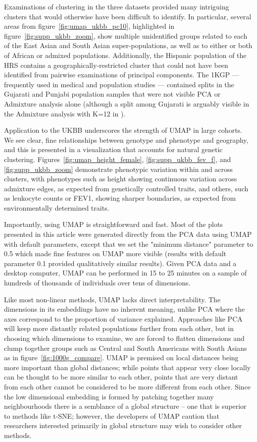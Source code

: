 \documentclass[12pt]{pnas-new}
\begin{document}
Examinations of clustering in the three datasets provided many intriguing clusters that would otherwise have been difficult to identify. In particular, several areas from figure~\ref{fig:umap_ukbb_pc10}, highlighted in figure~\ref{fig:supp_ukbb_zoom}, show multiple unidentified groups related to each of the East Asian and South Asian super-populations, as well as to either or both of African or admixed populations. Additionally, the Hispanic population of the HRS contains a geographically-restricted cluster that could not have been identified from pairwise examinations of principal components. The 1KGP --- frequently used in medical and population studies --- contained splits in the Gujarati and Punjabi population samples that were not visible PCA or Admixture analysis alone (although a split among Gujarati is arguably visible in the Admixture analysis with K=12 in \cite{10002015global}). 

Application to the UKBB underscores the strength of UMAP in large cohorts. We see clear, fine relationships between genotype and phenotype and geography, and this is presented in a visualization that accounts for natural genetic clustering. Figures~\ref{fig:umap_height_female}, \ref{fig:supp_ukbb_fev_f}, and \ref{fig:supp_ukbb_zoom} demonstrate phenotypic variation within and across clusters, with phenotypes such as height showing continuous variation across admixture edges, as expected from genetically controlled traits, and others, such as leukocyte counts or FEV1, showing sharper boundaries, as expected from environmentally determined traits.  

Importantly, using UMAP is straightforward and fast. Most of the plots presented in this article were generated directly from the PCA data using UMAP with default parameters, except that we set the "minimum distance" parameter to 0.5 which made fine features on UMAP more visible (results with default parameter 0.1 provided qualitatively similar results). Given PCA data and a desktop computer, UMAP can be performed in 15 to 25 minutes on a sample of hundreds of thousands of individuals over tens of dimensions. 

Like most non-linear methods, UMAP lacks direct interpretability. The dimensions in its embeddings have no inherent meaning, unlike PCA where the axes correspond to the proportion of variance explained. Approaches like PCA will keep more distantly related populations further from each other, but in choosing which dimensions to examine, we are forced to flatten dimensions and clump together groups such as Central and South Americans with South Asians as in figure~\ref{fig:1000g_compare}. UMAP is premised on local distances being more important than global distances; while points that appear very close locally can be thought to be more similar to each other, points that are very distant from each other cannot be considered to be more different from each other. Since the low dimensional embedding is formed by patching together many neighbourhoods there is a semblance of a global structure -- one that is superior to methods like t-SNE; however, the developers of UMAP caution that researchers interested primarily in global structure may wish to consider other methods.
\end{document}
